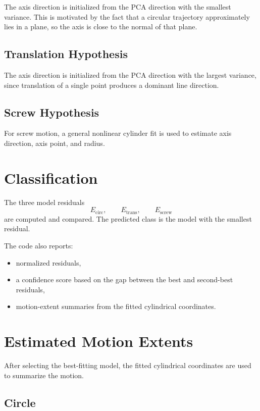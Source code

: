\documentclass[11pt]{article}
\begin{document}
The axis direction is initialized from the PCA direction with the smallest variance. This is motivated by the fact that a circular trajectory approximately lies in a plane, so the axis is close to the normal of that plane.

\subsection{Translation Hypothesis}

The axis direction is initialized from the PCA direction with the largest variance, since translation of a single point produces a dominant line direction.

\subsection{Screw Hypothesis}

For screw motion, a general nonlinear cylinder fit is used to estimate axis direction, axis point, and radius.

\section{Classification}

The three model residuals
\[
E_{\mathrm{circ}}, \qquad E_{\mathrm{trans}}, \qquad E_{\mathrm{screw}}
\]
are computed and compared. The predicted class is the model with the smallest residual.

The code also reports:
\begin{itemize}
    \item normalized residuals,
    \item a confidence score based on the gap between the best and second-best residuals,
    \item motion-extent summaries from the fitted cylindrical coordinates.
\end{itemize}

\section{Estimated Motion Extents}

After selecting the best-fitting model, the fitted cylindrical coordinates are used to summarize the motion.

\subsection{Circle}
\end{document}
